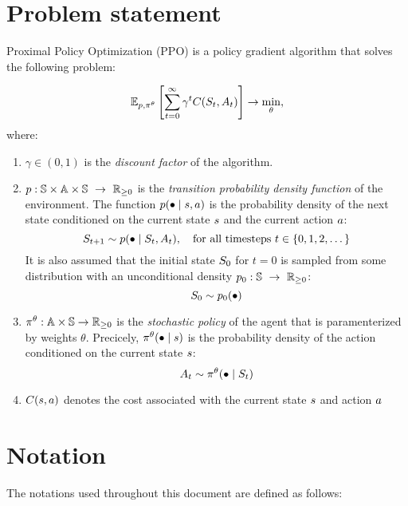 \documentclass[12pt,twoside]{../../mitthesis}
\begin{document}
\section*{Problem statement}
Proximal Policy Optimization (PPO) is a policy gradient algorithm that solves the following problem:

\begin{equation}
    \label{eqn_ppo_problem}
    \E[\transit, \policy^{\theta}]{\sum_{t = 0}^{\infty} \gamma ^ t \Cost(\State_{t}, \Action_{t})} \ra \min_{\theta},
\end{equation}
where:
\begin{enumerate}
    \item $\gamma \in (0, 1)$ is the \textit{discount factor} of the algorithm. 
    \item  $p : \mathbb S \times \mathbb A \times \mathbb S \ \rightarrow \ {\mathbb{R}}_{\geq 0}$ is the \textit{transition probability density function} of the environment. The function $p(\bullet \mid s, a)$ is the probability density of the next state conditioned on the current state $s$ and the current action $a$:
    $$
        S_{t+1} \sim p(\bullet \mid S_t, A_t), \quad \text{for all timesteps } t \in \{0, 1, 2,\dots\} 
    $$
    It is also assumed that the initial state $S_0$ for $t = 0$ is sampled from some distribution with an unconditional density $p_0 : \mathbb S \ \rightarrow \ {\mathbb{R}}_{\geq 0}$:
    $$
        S_0 \sim p_0(\bullet)
    $$
    \item $\pi^{\theta} : \mathbb A \times \mathbb S \rightarrow {\mathbb{R}}_{\geq 0}$ is the \textit{stochastic policy} of the agent that is paramenterized by weights $\theta$. Precicely, $\pi^{\theta}(\bullet \mid s)$ is the probability density of the action conditioned on the current state $s$:
    $$
        A_t \sim \pi^{\theta}(\bullet \mid S_t)
    $$
    \item $C(s, a)$ denotes the cost associated with the current state $s$ and action $a$
\end{enumerate}

\section*{Notation}

The notations used throughout this document are defined as follows:
\end{document}
